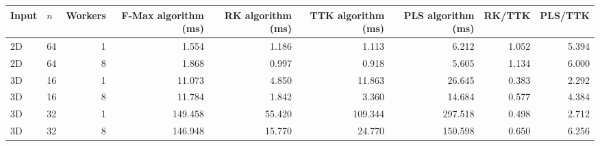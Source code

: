\begin{tabular}{llrrrrrrr}
\hline
Input & $n$ & Workers & F-Max algorithm (ms) & RK algorithm (ms) & TTK algorithm (ms) & PLS algorithm (ms) & RK/TTK & PLS/TTK \\
\hline
2D & 64 & 1 & 1.554 & 1.186 & 1.113 & 6.212 & 1.052 & 5.394 \\
2D & 64 & 8 & 1.868 & 0.997 & 0.918 & 5.605 & 1.134 & 6.000 \\
3D & 16 & 1 & 11.073 & 4.850 & 11.863 & 26.645 & 0.383 & 2.292 \\
3D & 16 & 8 & 11.784 & 1.842 & 3.360 & 14.684 & 0.577 & 4.384 \\
3D & 32 & 1 & 149.458 & 55.420 & 109.344 & 297.518 & 0.498 & 2.712 \\
3D & 32 & 8 & 146.948 & 15.770 & 24.770 & 150.598 & 0.650 & 6.256 \\
\hline
\end{tabular}
